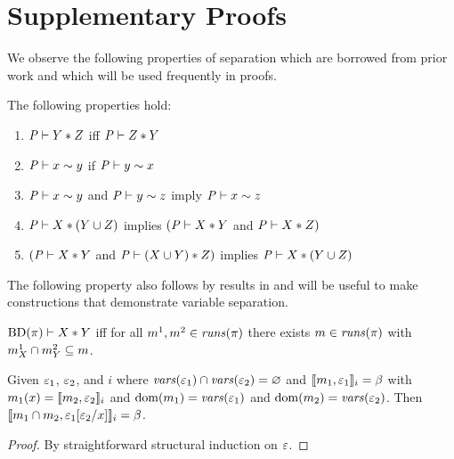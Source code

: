 \section{Supplementary Proofs}
\label{section-proofs}

We observe the following properties of separation which are borrowed from prior work
\cite{barthe2019probabilistic} and which will be used frequently in proofs. 
\begin{lemma}
  \label{lemma-separation}
  The following properties hold:
  \begin{enumerate}
  \item $\mathit{P} \vdash Y * Z$ iff $\mathit{P} \vdash Z * Y$
  \item $\mathit{P} \vdash x \sim y$ if  $\mathit{P} \vdash y \sim x$
  \item $\mathit{P} \vdash x \sim y$ and $\mathit{P} \vdash y \sim z$ imply $\mathit{P} \vdash x \sim z$
  \item $\mathit{P} \vdash X * (Y \cup Z)$ implies $(\mathit{P} \vdash X * Y$ and $\mathit{P} \vdash X * Z)$
  \item $(\mathit{P} \vdash X * Y$ and $\mathit{P} \vdash (X \cup Y) * Z)$ implies $\mathit{P} \vdash X * (Y \cup Z)$ 
  \end{enumerate}
\end{lemma}
The following property also follows by results in \cite{barthe2019probabilistic} and will
be useful to make constructions that demonstrate variable separation.
\begin{lemma}
  \label{lemma-sepjoin}
  $\mathrm{BD}(\pi) \vdash X * Y$ iff for all 
  $m^1, m^2 \in \mathit{runs}(\pi)$ there exists
  $m \in \mathit{runs}(\pi)$ with
  $m^1_{X} \cap m^2_{Y} \subseteq m$.
\end{lemma}

\begin{lemma}
  \label{lemma-presub}
  Given $\varepsilon_1$, $\varepsilon_2$, and $i$ where $\mathit{vars}(\varepsilon_1) \cap
  \mathit{vars}(\varepsilon_2) = \varnothing$ and $\llbracket m_1,\varepsilon_1 \rrbracket_{i} = \beta$
  with $m_1(x) = \llbracket m_2,\varepsilon_2 \rrbracket_{i}$ and
  $\mathrm{dom}(m_1) = \mathit{vars}(\varepsilon_1)$ and $\mathrm{dom}(m_2) = \mathit{vars}(\varepsilon_2)$.
  Then $\llbracket m_1\cap m_2,\varepsilon_1[\varepsilon_2/x] \rrbracket_{i} = \beta$.
\end{lemma}
\begin{proof}
By straightforward structural induction on $\varepsilon$.
\end{proof}

